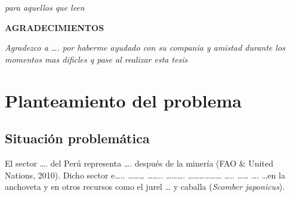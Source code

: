 \documentclass[
  12pt,
  letterpaper,
]{scrreprt}
\renewcommand*\contentsname{Tabla de contenidos}
\newcommand\contentsname{Tabla de contenidos}
\begin{document}

\begin{flushright}
  \vspace*{\fill}
\textit{para aquellos que leen}
\vspace*{\fill}
\end{flushright}

\pagebreak %

\textbf{AGRADECIMIENTOS}
\begin{flushright}
\begin{minipage}{10cm}
\textit{Agradezco a \ldots. por haberme ayudado con su compania y
amistad durante los momentos mas dificles q pase al realizar esta tesis}
\end{minipage}
\end{flushright}

\setlength{\parindent}{1.5em}

\renewcommand*\contentsname{Índice general}
{
\hypersetup{linkcolor=}
\setcounter{tocdepth}{2}
\tableofcontents
}
\listoffigures
\listoftables
{}

\chapter{Planteamiento del problema}\label{planteamiento-del-problema}


\section{Situación problemática}\label{situaciuxf3n-problemuxe1tica}

El sector \ldots. del Perú representa \ldots. después de la minería (FAO
\& United Nations, 2010). Dicho sector e\ldots.. \ldots\ldots\ldots{}
\ldots\ldots.. \ldots\ldots\ldots.
\ldots\ldots\ldots\ldots\ldots\ldots{} \ldots.. \ldots\ldots{} \ldots.
\ldots en la anchoveta y en otros recursos como el jurel \ldots{} y
caballa (\emph{Scomber japonicus}).
\end{document}
